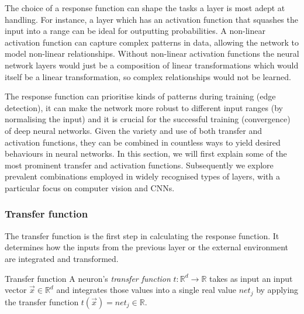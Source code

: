 The choice of a response function can shape the tasks a layer is most adept at handling. For instance, a layer which has an activation function that squashes the input into a range can be ideal for outputting probabilities. A non-linear activation function can capture complex patterns in data, allowing the network to model non-linear relationships. Without non-linear activation functions the neural network layers would just be a composition of linear transformations which would itself be a linear transformation, so complex relationships would not be learned. 

The response function can prioritise kinds of patterns during training (\eg edge detection), it can make the network more robust to different input ranges (\eg by normalising the input) and it is crucial for the successful training (\ie convergence) of deep neural networks. Given the variety and use of both transfer and activation functions, they can be combined in countless ways to yield desired behaviours in neural networks. In this section, we will first explain some of the most prominent transfer and activation functions. Subsequently we explore prevalent combinations employed in widely recognised types of layers, with a particular focus on computer vision and CNNs.

\subsubsection{Transfer function}
\label{section:trans}
The transfer function is the first step in calculating the response function. It determines how the inputs from the previous layer or the external environment are integrated and transformed. 

\begin{Definition}{Transfer function}{}
A neuron's \emph{transfer function} $t:\mathbb{R}^d \to \mathbb{R}$ takes as input an input vector $\vec{x}\in \mathbb{R}^d$ and integrates those values into a single real value $net_j$ by applying the transfer function $t(\vec{x})=net_j\in \mathbb{R}$.
\end{Definition}



